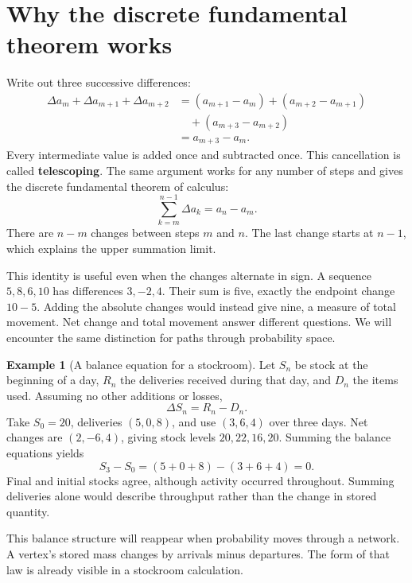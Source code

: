 \documentclass[11pt,oneside,openany]{book}
\theoremstyle{definition}
\newtheorem{example}{Example}[chapter]
\theoremstyle{remark}
\numberwithin{equation}{chapter}
\begin{document}
\section{Why the discrete fundamental theorem works}\label{ch01-why-the-discrete-fundamental-theorem-works}

Write out three successive differences: \[\begin{aligned}
\Delta a_m+\Delta a_{m+1}+\Delta a_{m+2}
&=(a_{m+1}-a_m)+(a_{m+2}-a_{m+1})\\
&\quad +(a_{m+3}-a_{m+2})\\
&=a_{m+3}-a_m.
\end{aligned}\] Every intermediate value is added once and subtracted once. This cancellation is called \textbf{telescoping}. The same argument works for any number of steps and gives the discrete fundamental theorem of calculus: \[\boxed{\sum_{k=m}^{n-1}\Delta a_k=a_n-a_m.}\] There are \(n-m\) changes between steps \(m\) and \(n\). The last change starts at \(n-1\), which explains the upper summation limit.

This identity is useful even when the changes alternate in sign. A sequence \(5,8,6,10\) has differences \(3,-2,4\). Their sum is five, exactly the endpoint change \(10-5\). Adding the absolute changes would instead give nine, a measure of total movement. Net change and total movement answer different questions. We will encounter the same distinction for paths through probability space.

\begin{example}[A balance equation for a stockroom]

Let \(S_n\) be stock at the beginning of a day, \(R_n\) the deliveries received during that day, and \(D_n\) the items used. Assuming no other additions or losses, \[\Delta S_n=R_n-D_n.\] Take \(S_0=20\), deliveries \((5,0,8)\), and use \((3,6,4)\) over three days. Net changes are \((2,-6,4)\), giving stock levels \(20,22,16,20\). Summing the balance equations yields \[S_3-S_0=(5+0+8)-(3+6+4)=0.\] Final and initial stocks agree, although activity occurred throughout. Summing deliveries alone would describe throughput rather than the change in stored quantity.

\end{example}

This balance structure will reappear when probability moves through a network. A vertex's stored mass changes by arrivals minus departures. The form of that law is already visible in a stockroom calculation.
\end{document}
